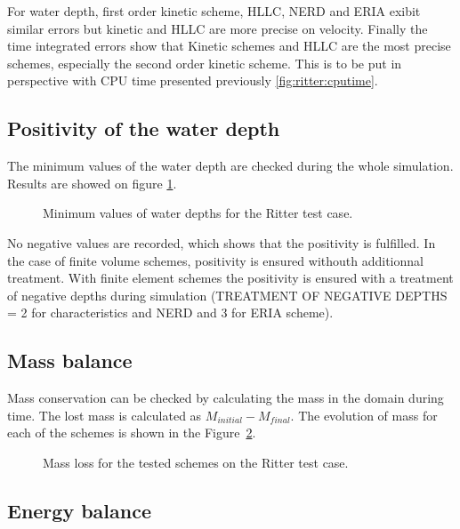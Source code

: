 For water depth, first order kinetic scheme, HLLC, NERD and ERIA exibit similar errors but kinetic and HLLC are more precise on velocity.
Finally the time integrated errors show that Kinetic schemes and HLLC are the most precise schemes, especially the second order kinetic scheme.
This is to be put in perspective with CPU time presented previously \ref{fig:ritter:cputime}.

\subsection{Positivity of the water depth}

The minimum values of the water depth are checked during the whole simulation.
Results are showed on figure \ref{t2d:ritter:minmax}.

\begin{figure}[H]
\centering
{}
\caption{Minimum values of water depths for the Ritter test case.}
\label{t2d:ritter:minmax}
\end{figure}

No negative values are recorded, which shows that the positivity is fulfilled.
In the case of finite volume schemes, positivity is ensured withouth additionnal treatment.
With finite element schemes the positivity is ensured with a treatment of negative depths
during simulation (TREATMENT OF NEGATIVE DEPTHS = 2 for characteristics and NERD and 3 for ERIA scheme).

\subsection{Mass balance}

Mass conservation can be checked by calculating the mass in the domain during time.
The lost mass is calculated as $M_{initial} - M_{final}$.
The evolution of mass for each of the schemes is shown in the Figure~\ref{fig:ritter:VoLTime}.

\begin{figure}[H]
\centering
  \caption{Mass loss for the tested schemes on the Ritter test case.}
\label{fig:ritter:VoLTime}
\end{figure}

\subsection{Energy balance}

